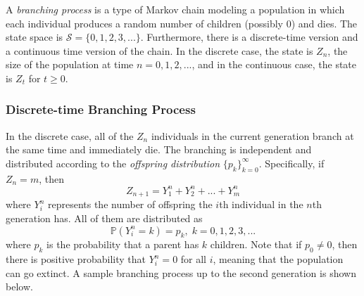   \begin{definition}
    A \textit{branching process} is a type of Markov chain modeling a population in which each individual produces a random number of children (possibly $0$) and dies. The state space is $\mathcal{S} = \{0, 1, 2, 3, ...\}$. Furthermore, there is a discrete-time version and a continuous time version of the chain. In the discrete case, the state is $Z_n$, the size of the population at time $n = 0, 1, 2, ...$, and in the continuous case, the state is $Z_t$ for $t \geq 0$. 
  \end{definition}

  \subsubsection{Discrete-time Branching Process}

    In the discrete case, all of the $Z_n$ individuals in the current generation branch at the same time and immediately die. The branching is independent and distributed according to the \textit{offspring distribution} $\{p_k\}_{k=0}^\infty$. Specifically, if $Z_n = m$, then 
    \begin{equation}
      Z_{n+1} = Y_1^n + Y_2^n + ... + Y_m^n
    \end{equation}
    where $Y_i^n$ represents the number of offspring the $i$th individual in the $n$th generation has. All of them are distributed as
    \begin{equation}
      \mathbb{P}(Y_i^n = k) = p_k, \; k = 0, 1, 2, 3, ...
    \end{equation}
    where $p_k$ is the probability that a parent has $k$ children. Note that if $p_0 \neq 0$, then there is positive probability that $Y_i^n = 0$ for all $i$, meaning that the population can go extinct. A sample branching process up to the second generation is shown below. 

    \begin{center}
    \end{center}

